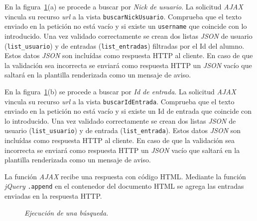 \documentclass[a4paper, 12pt]{book}
\begin{document}
\begin{itemize}
  En la figura~\ref{fig:buscarajax}(a) se procede a buscar por \textit{Nick de usuario}. La solicitud \textit{AJAX} vincula su recurso \textit{url} a la 
  vista \texttt{buscarNickUsuario}. Comprueba que el texto enviado en la petici\'on no est\'a vac\'io y si existe un \texttt{username} que coincide con lo
  introducido. Una vez validado correctamente se crean dos listas \textit{JSON} de usuario (\texttt{list\_usuario}) y de entradas (\texttt{list\_entradas}) 
  filtradas por el Id del alumno. Estos datos \textit{JSON} son inclu\'idas como respuesta HTTP al cliente. En caso de que la validaci\'on sea incorrecta 
  se enviar\'a como respuesta HTTP un \textit{JSON} vac\'io que saltar\'a en la plantilla renderizada como un mensaje de aviso.

  En la figura~\ref{fig:buscarajax}(b) se procede a buscar por \textit{Id de entrada}. La solicitud \textit{AJAX} vincula su recurso \textit{url} a la 
  vista \texttt{buscarIdEntrada}. Comprueba que el texto enviado en la petici\'on no est\'a vac\'io y si existe un Id de entrada que coincide con lo
  introducido. Una vez validado correctamente se crean dos listas \textit{JSON} de usuario (\texttt{list\_usuario}) y de entrada (\texttt{list\_entrada}). 
  Estos datos \textit{JSON} son inclu\'idas como respuesta HTTP al cliente. En caso de que la validaci\'on sea incorrecta se enviar\'a como respuesta HTTP 
  un \textit{JSON} vac\'io que saltar\'a en la plantilla renderizada como un mensaje de aviso.
  
  La funci\'on \textit{AJAX} recibe una respuesta con c\'odigo HTML. Mediante la funci\'on \textit{jQuery} \texttt{.append} en el contenedor del documento 
  HTML se agrega las entradas enviadas en la respuesta HTTP.
  
  \begin{figure}
    \centering
    \caption{\textit{Ejecuci\'on de una b\'usqueda.}}
    \label{fig:buscarajax}
  \end{figure}
  
\end{itemize}
\end{document}
